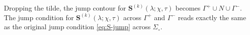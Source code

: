 Dropping the tilde, the jump contour for $\mathbf{S}^{(k)}(\lambda;\chi,\tau)$ becomes $\Gamma^+\cup N\cup \Gamma^-$.  The jump condition for $\mathbf{S}^{(k)}(\lambda;\chi,\tau)$ across $\Gamma^+$ and $\Gamma^-$ reads exactly the same as the original jump condition \eqref{eq:S-jump} across $\Sigma_\circ$.  
